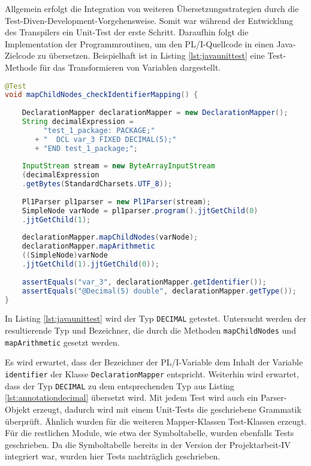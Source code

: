 Allgemein erfolgt die Integration von weiteren Übersetzungsstrategien durch die Test-Diven-Development-Vorgehensweise. Somit war während der Entwicklung des Transpilers ein Unit-Test der erste Schritt. Daraufhin folgt die Implementation der Programmroutinen, um den PL/I-Quellcode in einen Java-Zielcode zu übersetzen.
Beispielhaft ist in Listing \ref{lst:javaunittest} eine Test-Methode für das Transformieren von Variablen dargestellt.

\begin{lstlisting}[language=Java, caption=Arithmetic Node Unit-test, label={lst:javaunittest}]
@Test
void mapChildNodes_checkIdentifierMapping() {
	
	DeclarationMapper declarationMapper = new DeclarationMapper();
	String decimalExpression = 
		 "test_1_package: PACKAGE;" 
	   + "	DCL var_3 FIXED DECIMAL(5);" 
	   + "END test_1_package;";
	
	InputStream stream = new ByteArrayInputStream
	(decimalExpression
	.getBytes(StandardCharsets.UTF_8));
	
	Pl1Parser pl1parser = new Pl1Parser(stream);
	SimpleNode varNode = pl1parser.program().jjtGetChild(0)
	.jjtGetChild(1);
		
	declarationMapper.mapChildNodes(varNode);
	declarationMapper.mapArithmetic
	((SimpleNode)varNode
	.jjtGetChild(1).jjtGetChild(0));
		
	assertEquals("var_3", declarationMapper.getIdentifier());
	assertEquals("@Decimal(5) double", declarationMapper.getType());
}
\end{lstlisting} 

In Listing \ref{lst:javaunittest}  wird der Typ \verb+DECIMAL+ getestet. Untersucht werden der resultierende Typ und Bezeichner, die durch die Methoden \verb+mapChildNodes+ und \verb+mapArithmetic+ gesetzt werden.

Es wird erwartet, dass der Bezeichner der PL/I-Variable dem Inhalt der Variable \verb+identifier+ der Klasse \verb+DeclarationMapper+ entspricht.
Weiterhin wird erwartet, dass der Typ \verb+DECIMAL+ zu dem entsprechenden Typ aus Listing \ref{lst:annotationdecimal} übersetzt wird.
Mit jedem Test wird auch ein Parser-Objekt erzeugt, dadurch wird  mit einem Unit-Tests die geschriebene Grammatik überprüft.
Ähnlich wurden  für die weiteren Mapper-Klassen Test-Klassen erzeugt.
Für die restlichen Module, wie etwa der Symboltabelle, wurden ebenfalls Tests geschrieben.
Da die Symboltabelle bereits in der Version der Projektarbeit-IV integriert war, wurden hier  Tests nachträglich geschrieben. 

